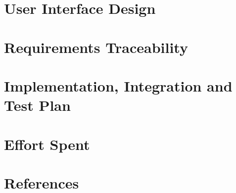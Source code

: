 \documentclass{Configuration_Files/PoliMi3i_thesis}
\begin{document}
    \chapter{User Interface Design}
    \label{ch:user_interface_design}%
    


    \chapter{Requirements Traceability}
    \label{ch:requirements_traceability}%
    


    \chapter{Implementation, Integration and Test Plan}
    \label{ch:implementation_integration_test_plan}%
    


    \chapter{Effort Spent}
    \label{ch:effort_spent}%
    

    \chapter{References}
    \label{ch:references}%
    

    \listoffigures

    \listoftables
    \cleardoublepage
\end{document}
